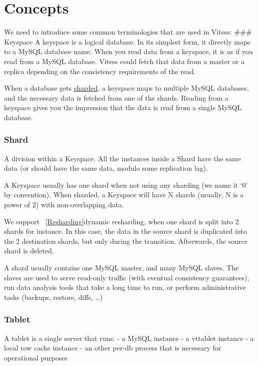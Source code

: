 \section{Concepts}\label{Concepts}

We need to introduce some common terminologies that are used in Vitess:
\#\#\# Keyspace
A keyspace is a logical database.
In its simplest form, it directly maps to a MySQL database name.
When you read data from a keyspace, it is as if you read from a MySQL database.
Vitess could fetch that data from a master or a replica depending
on the consistency requirements of the read.

When a database gets \href{http://en.wikipedia.org/wiki/Shard\_(database\_architecture)}{sharded},
a keyspace maps to multiple MySQL databases,
and the necessary data is fetched from one of the shards.
Reading from a keyspace gives you the impression that the data is read from
a single MySQL database.

\subsubsection{Shard}\hypertarget{shard}{}\label{shard}

A division within a Keyspace. All the instances inside a Shard have the same data (or should have the same data,
modulo some replication lag).

A Keyspace usually has one shard when not using any sharding (we name it `0' by convention). When sharded, a Keyspace will have N shards (usually, N is a power of 2) with non-overlapping data.

We support ~\ref{Resharding}{dynamic resharding}, when one shard is split into 2 shards for instance. In this case, the data in the
source shard is duplicated into the 2 destination shards, but only during the transition. Afterwards, the source shard is
deleted.

A shard usually contains one MySQL master, and many MySQL slaves. The slaves are used to serve read-only traffic (with
eventual consistency guarantees), run data analysis tools that take a long time to run, or perform administrative tasks (backups, restore, diffs, \ldots{})

\subsubsection{Tablet}\hypertarget{tablet}{}\label{tablet}

A tablet is a single server that runs:
- a MySQL instance
- a vttablet instance
- a local row cache instance
- an other per-db process that is necessary for operational purposes

